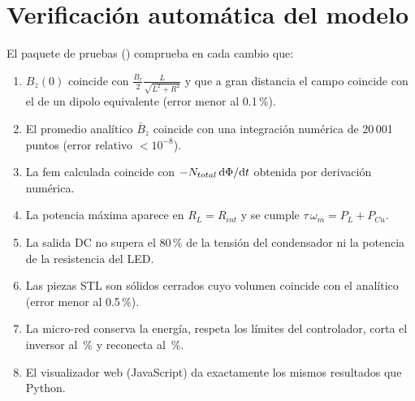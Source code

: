\documentclass[11pt]{article}
\begin{document}
\section{Verificación automática del modelo}
El paquete de pruebas () comprueba en cada cambio que:
\begin{enumerate}
  \item $B_z(0)$ coincide con $\frac{B_r}{2}\frac{L}{\sqrt{L^2+R^2}}$ y que a gran distancia el campo coincide con el de un
        dipolo equivalente (error menor al 0.1\,\%).
  \item El promedio analítico $\bar B_z$ coincide con una integración numérica de 20\,001 puntos (error relativo
        $<10^{-8}$).
  \item La fem calculada coincide con $-N_{total}\,\mathrm{d}\Phi/\mathrm{d} t$ obtenida por derivación numérica.
  \item La potencia máxima aparece en $R_L=R_{int}$ y se cumple $\tau\,\omega_m=P_L+P_{Cu}$.
  \item La salida DC no supera el 80\,\% de la tensión del condensador ni la potencia de la resistencia del LED.
  \item Las piezas STL son sólidos cerrados cuyo volumen coincide con el analítico (error menor al 0.5\,\%).
  \item La micro-red conserva la energía, respeta los límites del controlador, corta el inversor al \ValSocCorte\,\% y reconecta al \ValSocReconexion\,\%.
  \item El visualizador web (JavaScript) da exactamente los mismos resultados que Python.
\end{enumerate}
\end{document}
